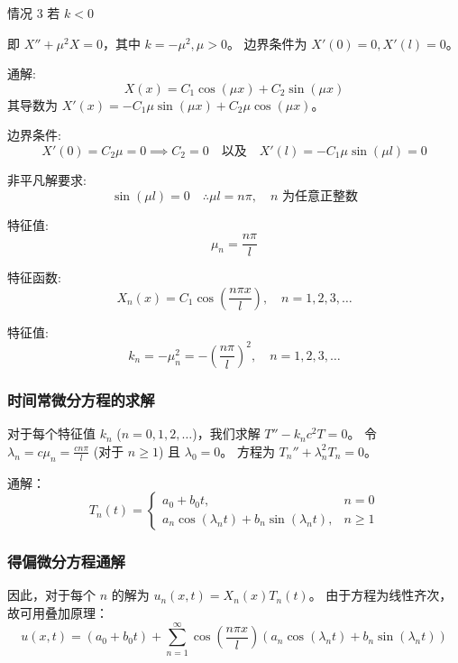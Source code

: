 \documentclass[12pt,a4paper]{article}
\numberwithin{subsection}{section}   %
\numberwithin{subsubsection}{subsection}
\theoremstyle{plain}
\theoremstyle{definition}
\theoremstyle{remark}
\theoremstyle{remark}
\begin{document}
	情况 3 \quad 若 \(k < 0\)
	
	即 \(X'' + \mu^2 X = 0\)，其中 \(k = -\mu^2, \mu > 0\)。
	边界条件为 $X'(0) = 0, X'(l) = 0$。
	
	通解:
	\begin{equation}
		X(x) = C_1 \cos(\mu x) + C_2 \sin(\mu x)
	\end{equation}
	其导数为 $X'(x) = -C_1 \mu \sin(\mu x) + C_2 \mu \cos(\mu x)$。
	
	边界条件:
	\begin{equation}
		X'(0) = C_2 \mu = 0 \implies C_2 = 0 \quad \text{以及} \quad X'(l) = -C_1 \mu \sin(\mu l) = 0
	\end{equation}
	
	非平凡解要求:
	\begin{equation*}
		\sin(\mu l) = 0 \quad \therefore \mu l = n\pi, \quad n \text{ 为任意正整数}
	\end{equation*}
	
	特征值:
	\begin{equation}
		\mu_n = \frac{n\pi}{l}
	\end{equation}
	
	特征函数:
	\begin{equation}
		X_n(x) = C_1 \cos\left(\frac{n\pi x}{l}\right), \quad n = 1, 2, 3, \ldots
	\end{equation}
	
	特征值:
	\begin{equation}
		k_n = -\mu_n^2 = -\left(\frac{n\pi}{l}\right)^2, \quad n = 1, 2, 3, \ldots
	\end{equation}
	
	\subsubsection{时间常微分方程的求解}
	对于每个特征值 $k_n$ ($n=0, 1, 2, \ldots$)，我们求解 $T'' - k_n c^2 T = 0$。
	令 $\lambda_n = c \mu_n = \frac{cn\pi}{l}$ (对于 $n \ge 1$) 且 $\lambda_0 = 0$。
	方程为 $T_n'' + \lambda_n^2 T_n = 0$。
	
	通解：
	\begin{equation}
		T_n(t) = 
		\begin{cases}
			a_0 + b_0 t, & n=0 \\
			a_n \cos(\lambda_n t) + b_n \sin(\lambda_n t), & n \ge 1
		\end{cases}
	\end{equation}
	
	\subsubsection{得偏微分方程通解}
	因此，对于每个 $n$ 的解为 $u_n(x,t) = X_n(x) T_n(t)$。
	由于方程为线性齐次，故可用叠加原理：
	\begin{equation}
		u(x, t) = (a_0 + b_0 t) + \sum_{n=1}^{\infty} \cos\left(\frac{n\pi x}{l}\right) \left( a_n \cos(\lambda_n t) + b_n \sin(\lambda_n t) \right)
	\end{equation}
	
\end{document}

